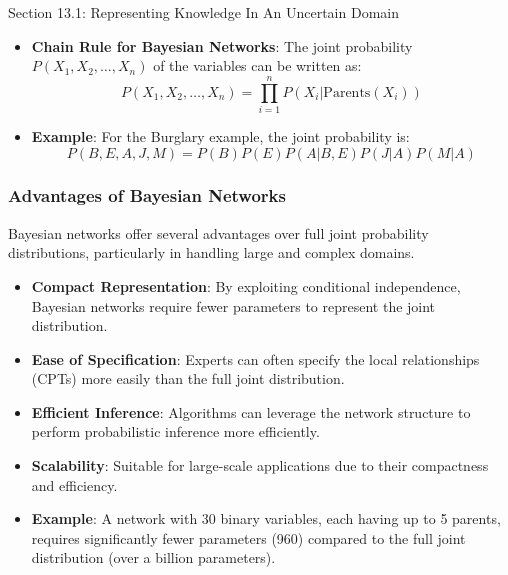 \begin{notes}{Section 13.1: Representing Knowledge In An Uncertain Domain}
\begin{highlight}
        \begin{itemize}
            \item \textbf{Chain Rule for Bayesian Networks}: The joint probability $P(X_1, X_2, \ldots, X_n)$ of the variables can be written as:
            \[
            P(X_1, X_2, \ldots, X_n) = \prod_{i=1}^n P(X_i | \text{Parents}(X_i))
            \]
            \item \textbf{Example}: For the Burglary example, the joint probability is:
            \[
            P(B, E, A, J, M) = P(B) P(E) P(A | B, E) P(J | A) P(M | A)
            \]
        \end{itemize}
    
    \end{highlight}
    
    \subsubsection*{Advantages of Bayesian Networks}
    
    Bayesian networks offer several advantages over full joint probability distributions, particularly in handling large and complex domains.
    
    \begin{highlight}
    
        \begin{itemize}
            \item \textbf{Compact Representation}: By exploiting conditional independence, Bayesian networks require fewer parameters to represent the joint distribution.
            \item \textbf{Ease of Specification}: Experts can often specify the local relationships (CPTs) more easily than the full joint distribution.
            \item \textbf{Efficient Inference}: Algorithms can leverage the network structure to perform probabilistic inference more efficiently.
            \item \textbf{Scalability}: Suitable for large-scale applications due to their compactness and efficiency.
            \item \textbf{Example}: A network with 30 binary variables, each having up to 5 parents, requires significantly fewer parameters (960) compared to the full joint distribution (over a billion parameters).
        \end{itemize}
    
    \end{highlight}
    

\end{notes}
